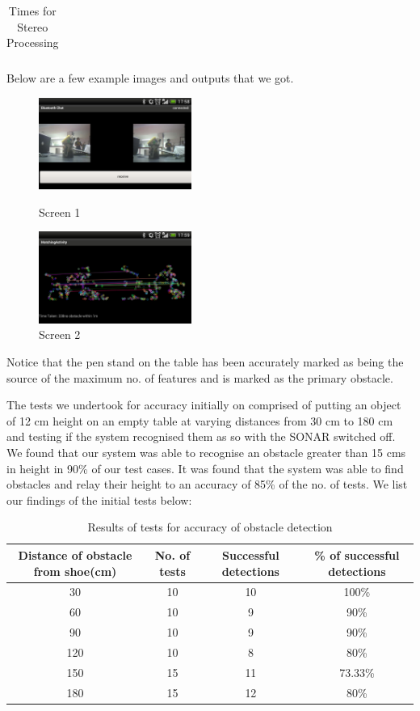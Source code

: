 \documentclass[11pt]{report}
\begin{document}
{{\begin{table}[h]
\begin{tabular}{|c|c|}
\end{tabular}
\caption{Times for Stereo Processing}
\end{table}

Below are a few example images and outputs that we got.

\begin{figure}[h]
\centering
\parbox{5cm}{
\includegraphics[width=5cm]{screen1.png}
\caption{Screen 1}
\label{fig:2figsA1}}
\qquad
\begin{minipage}{5cm}
\includegraphics[width=5cm]{screen2.png}
\caption{Screen 2}
\label{fig:2figsB1}
\end{minipage}
\end{figure}
Notice that the pen stand on the table has been accurately marked as being the source of the maximum no. of features and is marked as the primary obstacle. 
  
The tests we undertook for accuracy initially on comprised of putting an object of 12 cm height on an empty table at varying distances from 30 cm to 180 cm and testing if the system recognised them as so with the SONAR switched off. We found that our system was able to recognise an obstacle greater than 15 cms in height in 90\% of our test cases. It was found that the system was able to find obstacles and relay their height to an accuracy of 85\% of the no. of tests. We list our findings of the initial tests below:

\begin{table}[h]
\begin{tabular}{|c|c|c|c|}
\hline
Distance of obstacle from shoe(cm) & No. of  tests & Successful detections & \% of successful detections\\
\hline
30 & 10 & 10 & 100\%\\
60 & 10 & 9 & 90\% \\
90 & 10 & 9 & 90\% \\
120 & 10 & 8 & 80\%\\
150 & 15 & 11 & 73.33\% \\
180 & 15 & 12 & 80\% \\
\hline
\end{tabular}
\caption{Results of tests for accuracy of obstacle detection}


\end{table}}}
\end{document}
